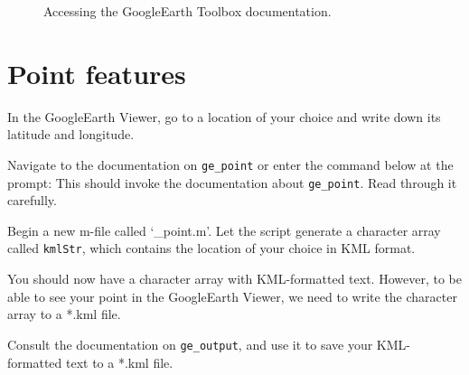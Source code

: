 \begin{figure}[!htb]
  \centering
  \caption{Accessing the GoogleEarth Toolbox documentation.}\label{fig:googleearth-help-menu}
\end{figure}







\section{Point features}
\begin{action}
In the GoogleEarth Viewer, go to a location of your choice and write down its latitude and longitude. 
\end{action}

\begin{action}
Navigate to the documentation on {\tt ge\_point} or enter the command below at the prompt:
This should invoke the documentation about {\tt ge\_point}. Read through it carefully.
\end{action}

\begin{action}
Begin a new m-file called `\_point.m'. Let the script generate a character array called {\tt kmlStr}, which contains the location of your choice in KML format.
\end{action}
You should now have a character array with KML-formatted text. However, to be able to see your point in the GoogleEarth Viewer, we need to write the character array to a *.kml file.
\begin{action}
Consult the documentation on {\tt ge\_output}, and use it to save your KML-formatted text to a *.kml file. 
\end{action}

